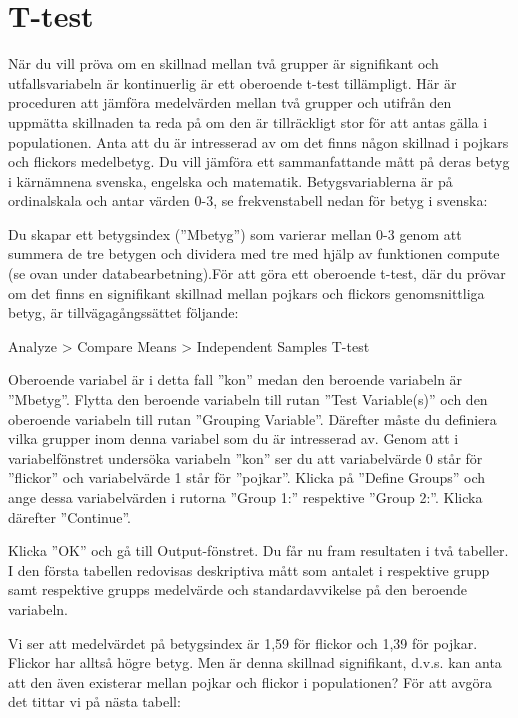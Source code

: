 \documentclass[
]{book}
\begin{document}
\hypertarget{t-test}{%
\chapter{T-test}\label{t-test}}

När du vill pröva om en skillnad mellan två grupper är signifikant och utfallsvariabeln är kontinuerlig är
ett oberoende t-test tillämpligt. Här är proceduren att jämföra medelvärden mellan två grupper och
utifrån den uppmätta skillnaden ta reda på om den är tillräckligt stor för att antas gälla i populationen.
Anta att du är intresserad av om det finns någon skillnad i pojkars och flickors medelbetyg. Du vill
jämföra ett sammanfattande mått på deras betyg i kärnämnena svenska, engelska och matematik.
Betygsvariablerna är på ordinalskala och antar värden 0-3, se frekvenstabell nedan för betyg i
svenska:

Du skapar ett betygsindex (''Mbetyg'') som varierar mellan 0-3 genom att summera de tre betygen
och dividera med tre med hjälp av funktionen compute (se ovan under databearbetning).För att göra ett oberoende t-test, där du prövar om det finns en signifikant skillnad mellan pojkars och
flickors genomsnittliga betyg, är tillvägagångssättet följande:

Analyze \textgreater{} Compare Means \textgreater{} Independent Samples T-test

Oberoende variabel är i detta fall ''kon'' medan den beroende variabeln är ''Mbetyg''. Flytta den
beroende variabeln till rutan ''Test Variable(s)'' och den oberoende variabeln till rutan ''Grouping
Variable''. Därefter måste du definiera vilka grupper inom denna variabel som du är intresserad av.
Genom att i variabelfönstret undersöka variabeln ''kon'' ser du att variabelvärde 0 står för ''flickor''
och variabelvärde 1 står för ''pojkar''. Klicka på ''Define Groups'' och ange dessa variabelvärden i
rutorna ''Group 1:'' respektive ''Group 2:''. Klicka därefter ''Continue''.

Klicka ''OK'' och gå till Output-fönstret. Du får nu fram resultaten i två tabeller. I den första tabellen
redovisas deskriptiva mått som antalet i respektive grupp samt respektive grupps medelvärde och
standardavvikelse på den beroende variabeln.

Vi ser att medelvärdet på betygsindex är 1,59 för flickor och 1,39 för pojkar. Flickor har alltså högre
betyg. Men är denna skillnad signifikant, d.v.s. kan anta att den även existerar mellan pojkar och
flickor i populationen? För att avgöra det tittar vi på nästa tabell:
\end{document}
